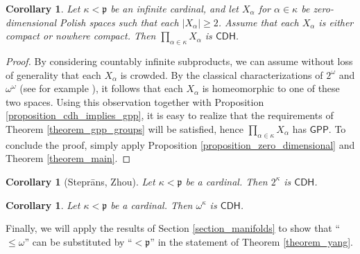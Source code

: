 \documentclass{amsart}
\theoremstyle{plain}
\newtheorem{corollary}[theorem]{Corollary}
\theoremstyle{definition}
\newcommand{\CDH}{\mathsf{CDH}}
\newcommand{\GPP}{\mathsf{GPP}}
\newcommand{\pppp}{\mathfrak{p}}
\begin{document}
\begin{corollary}\label{corollary_main_zero_dimensional}
Let $\kappa<\pppp$ be an infinite cardinal, and let $X_\alpha$ for $\alpha\in\kappa$ be zero-dimensional Polish spaces such that each $|X_\alpha|\geq 2$. Assume that each $X_\alpha$ is either compact or nowhere compact. Then $\prod_{\alpha\in\kappa}X_\alpha$ is $\CDH$.
\end{corollary}
\begin{proof}
By considering countably infinite subproducts, we can assume without loss of generality that each $X_\alpha$ is crowded. By the classical characterizations of $2^\omega$ and $\omega^\omega$ (see for example \cite[Theorems 1.5.5 and 1.9.8]{van_mill_book}), it follows that each $X_\alpha$ is homeomorphic to one of these two spaces. Using this observation together with Proposition \ref{proposition_cdh_implies_gpp}, it is easy to realize that the requirements of Theorem \ref{theorem_gpp_groups} will be satisfied, hence $\prod_{\alpha\in\kappa}X_\alpha$ has $\GPP$. To conclude the proof, simply apply Proposition \ref{proposition_zero_dimensional} and Theorem \ref{theorem_main}.
\end{proof}

\begin{corollary}[Stepr\={a}ns, Zhou]\label{corollary_main_cantor}
Let $\kappa<\pppp$ be a cardinal. Then $2^\kappa$ is $\CDH$.
\end{corollary}

\begin{corollary}\label{corollary_main_baire}
Let $\kappa<\pppp$ be a cardinal. Then $\omega^\kappa$ is $\CDH$.
\end{corollary}

Finally, we will apply the results of Section \ref{section_manifolds} to show that ``$\leq\omega$'' can be substituted by ``$<\pppp$'' in the statement of Theorem \ref{theorem_yang}.
\end{document}
